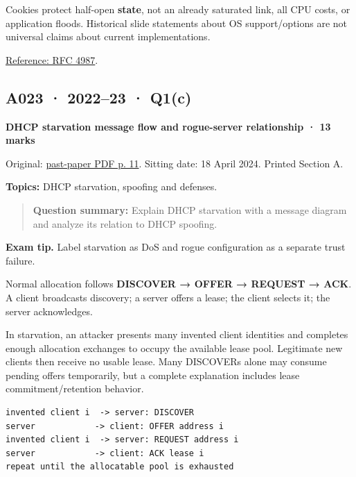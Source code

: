 \documentclass[11pt,a4paper]{article}
\begin{document}
Cookies protect half-open \textbf{state},\allowbreak{} not an already saturated link,\allowbreak{} all CPU costs,\allowbreak{} or application floods. Historical slide statements about OS support/\allowbreak{}options are not universal claims about current implementations.


\href{https://www.rfc-editor.org/rfc/rfc4987}{Reference: RFC 4987}.




\clearpage
\subsection{A023 · 2022–23 · Q1(c)}\label{a023}

\textbf{DHCP starvation message flow and rogue-server relationship · 13 marks}


Original: \href{../../CSE405-Security_Merged.pdf\#page=11}{past-paper PDF p. 11}. Sitting date: 18 April 2024. Printed Section A.


\textbf{Topics:} DHCP starvation,\allowbreak{} spoofing and defenses.



\begin{quote}\small

\textbf{Question summary:} Explain DHCP starvation with a message diagram and analyze its relation to DHCP spoofing.



\end{quote}


{\color{ForestGreen}\textbf{Exam tip.} Label starvation as DoS and rogue configuration as a separate trust failure.}


Normal allocation follows \textbf{DISCOVER → OFFER → REQUEST → ACK}. A client broadcasts discovery; a server offers a lease; the client selects it; the server acknowledges.


In starvation,\allowbreak{} an attacker presents many invented client identities and completes enough allocation exchanges to occupy the available lease pool. Legitimate new clients then receive no usable lease. Many DISCOVERs alone may consume pending offers temporarily,\allowbreak{} but a complete explanation includes lease commitment/\allowbreak{}retention behavior.



\begin{Verbatim}[breaklines=true,breakanywhere=true,fontsize=\small,frame=single,rulecolor=\color{PanelBorder}]
invented client i  -> server: DISCOVER
server            -> client: OFFER address i
invented client i  -> server: REQUEST address i
server            -> client: ACK lease i
repeat until the allocatable pool is exhausted
\end{Verbatim}
\end{document}
